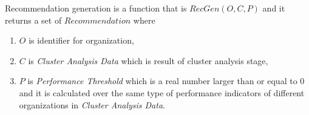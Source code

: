 \theoremstyle{definition}
\begin{definition}
Recommendation generation is a function that is $RecGen(O, C, P)$ and it returns a set of $Recommendation$ where
  \begin{enumerate}
    \item $O$ is identifier for organization,
    \item $C$ is \textit{Cluster Analysis Data} which is result of cluster analysis stage,
    \item $P$ is \textit{Performance Threshold} which is a real number larger than or equal to 0 and it is calculated over the same type of performance indicators of different organizations in \textit{Cluster Analysis Data}.
  \end{enumerate}
\end{definition}

